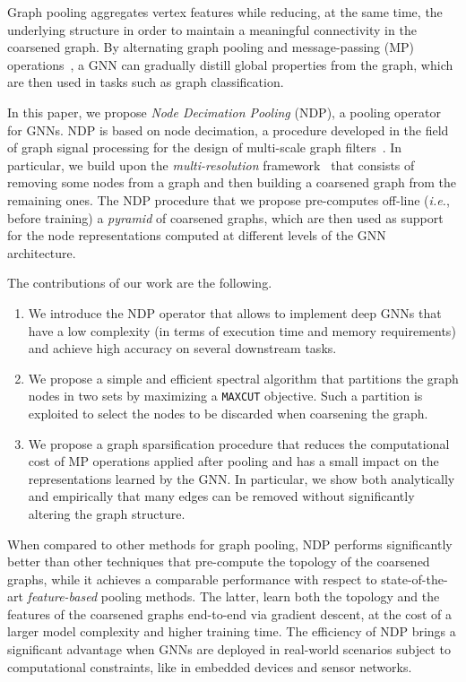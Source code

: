 \documentclass[journal]{IEEEtran}
\newcommand{\maxcut}{\texttt{\small{MAXCUT}}}
\begin{document}
Graph pooling aggregates vertex features while reducing, at the same time, the underlying structure in order to maintain a meaningful connectivity in the coarsened graph. 
By alternating graph pooling and message-passing (MP) operations~\cite{gilmer2017neural}, a GNN can gradually distill global properties from the graph, which are then used in tasks such as graph classification.


In this paper, we propose \textit{Node Decimation Pooling} (NDP), a pooling operator for GNNs. 
NDP is based on node decimation, a procedure developed in the field of graph signal processing for the design of multi-scale graph filters~\cite{tremblay2018design}.
In particular, we build upon the \textit{multi-resolution} framework~\cite{shuman2016multiscale} that consists of removing some nodes from a graph and then building a coarsened graph from the remaining ones.
The NDP procedure that we propose pre-computes off-line (\textit{i.e.}, before training) a \textit{pyramid} of coarsened graphs, which are then used as support for the node representations computed at different levels of the GNN architecture.

The contributions of our work are the following.

\begin{enumerate}
    \item We introduce the NDP operator that allows to implement deep GNNs that have a low complexity (in terms of execution time and memory requirements) and achieve high accuracy on several downstream tasks.
    \item We propose a simple and efficient spectral algorithm that partitions the graph nodes in two sets by maximizing a \maxcut{} objective. Such a partition is exploited to select the nodes to be discarded when coarsening the graph.
    \item We propose a graph sparsification procedure that reduces the computational cost of MP operations applied after pooling and has a small impact on the representations learned by the GNN. 
    In particular, we show both analytically and empirically that many edges can be removed without significantly altering the graph structure.
\end{enumerate}

When compared to other methods for graph pooling, NDP performs significantly better than other techniques that pre-compute the topology of the coarsened graphs, while it achieves a comparable performance with respect to state-of-the-art \textit{feature-based} pooling methods.
The latter, learn both the topology and the features of the coarsened graphs end-to-end via gradient descent, at the cost of a larger model complexity and higher training time.
The efficiency of NDP brings a significant advantage when GNNs are deployed in real-world scenarios subject to computational constraints, like in embedded devices and sensor networks.
\end{document}

